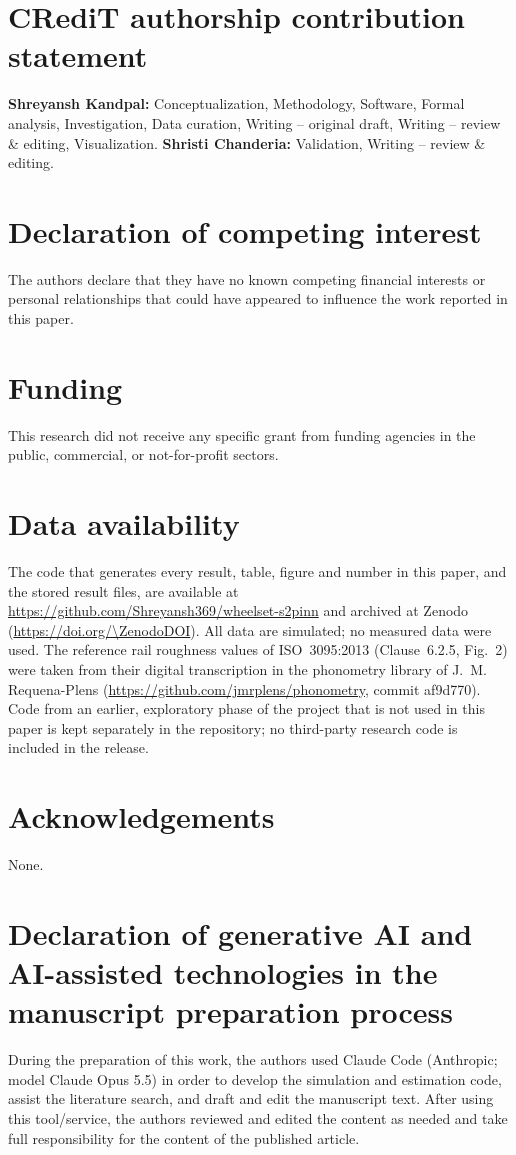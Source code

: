 
\section*{CRediT authorship contribution statement}
\textbf{Shreyansh Kandpal:} Conceptualization, Methodology, Software, Formal analysis, Investigation, Data
curation, Writing -- original draft, Writing -- review \& editing, Visualization.
\textbf{Shristi Chanderia:} Validation, Writing -- review \& editing.

\section*{Declaration of competing interest}
The authors declare that they have no known competing financial interests or personal relationships
that could have appeared to influence the work reported in this paper.

\section*{Funding}
This research did not receive any specific grant from funding agencies in the public, commercial, or
not-for-profit sectors.

\section*{Data availability}
The code that generates every result, table, figure and number in this paper, and the stored result
files, are available at \url{https://github.com/Shreyansh369/wheelset-s2pinn} and archived at Zenodo
(\url{https://doi.org/\ZenodoDOI}). All data are simulated; no measured data were used. The reference rail roughness values of ISO~3095:2013
(Clause~6.2.5, Fig.~2) were taken from their digital transcription in the phonometry library of
J.~M. Requena-Plens (\url{https://github.com/jmrplens/phonometry}, commit af9d770). Code from an earlier,
exploratory phase of the project that is not used in this paper is kept separately in the repository;
no third-party research code is included in the release.

\section*{Acknowledgements}
None.

\section*{Declaration of generative AI and AI-assisted technologies in the manuscript preparation process}
During the preparation of this work, the authors used Claude Code (Anthropic; model Claude Opus 5.5) in
order to develop the simulation and estimation code, assist the literature search, and draft and edit the
manuscript text.
After using this tool/service, the authors reviewed and edited the content as needed and take full
responsibility for the content of the published article.
